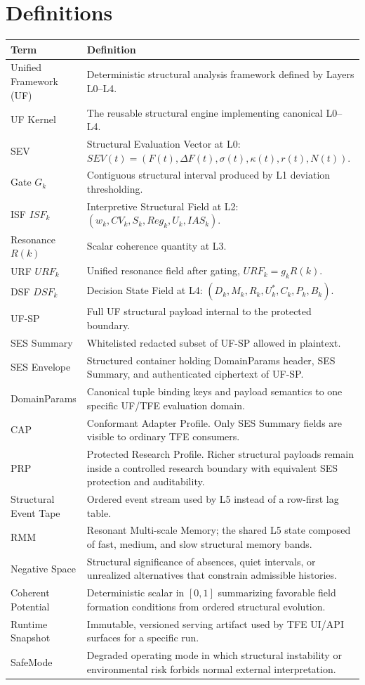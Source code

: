 \documentclass[11pt]{report}
\begin{document}
\section{Definitions}
\begin{longtable}{p{}p{}}
\toprule
Term & Definition \\
\midrule
Unified Framework (UF) & Deterministic structural analysis framework defined by Layers L0--L4. \\
UF Kernel & The reusable structural engine implementing canonical L0--L4. \\
SEV & Structural Evaluation Vector at L0: $SEV(t)=(F(t),\Delta F(t),\sigma(t),\kappa(t),r(t),N(t))$. \\
Gate $G_k$ & Contiguous structural interval produced by L1 deviation thresholding. \\
ISF $ISF_k$ & Interpretive Structural Field at L2: $(w_k,CV_k,S_k,Reg_k,U_k,IAS_k)$. \\
Resonance $R(k)$ & Scalar coherence quantity at L3. \\
URF $URF_k$ & Unified resonance field after gating, $URF_k=g_kR(k)$. \\
DSF $DSF_k$ & Decision State Field at L4: $(D_k,M_k,R_k,U_k^{\ast},C_k,P_k,B_k)$. \\
UF-SP & Full UF structural payload internal to the protected boundary. \\
SES Summary & Whitelisted redacted subset of UF-SP allowed in plaintext. \\
SES Envelope & Structured container holding DomainParams header, SES Summary, and authenticated ciphertext of UF-SP. \\
DomainParams & Canonical tuple binding keys and payload semantics to one specific UF/TFE evaluation domain. \\
CAP & Conformant Adapter Profile. Only SES Summary fields are visible to ordinary TFE consumers. \\
PRP & Protected Research Profile. Richer structural payloads remain inside a controlled research boundary with equivalent SES protection and auditability. \\
Structural Event Tape & Ordered event stream used by L5 instead of a row-first lag table. \\
RMM & Resonant Multi-scale Memory; the shared L5 state composed of fast, medium, and slow structural memory bands. \\
Negative Space & Structural significance of absences, quiet intervals, or unrealized alternatives that constrain admissible histories. \\
Coherent Potential & Deterministic scalar in $[0,1]$ summarizing favorable field formation conditions from ordered structural evolution. \\
Runtime Snapshot & Immutable, versioned serving artifact used by TFE UI/API surfaces for a specific run. \\
SafeMode & Degraded operating mode in which structural instability or environmental risk forbids normal external interpretation. \\
\bottomrule
\end{longtable}
\end{document}
